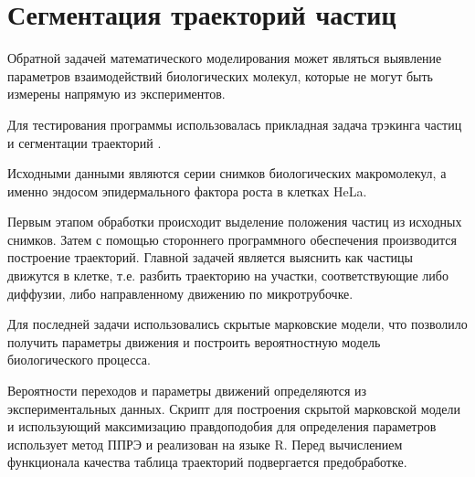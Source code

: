 \section*{Сегментация траекторий частиц}

Обратной задачей математического моделирования
может являться выявление параметров взаимодействий биологических молекул,
которые не могут быть измерены напрямую из экспериментов.

Для тестирования программы использовалась
прикладная задача трэкинга частиц
и сегментации траекторий \cite{track}.

Исходными данными являются
серии снимков биологических макромолекул,
а именно эндосом эпидермального фактора роста
в клетках HeLa.

Первым этапом обработки происходит выделение
положения частиц из исходных снимков.
Затем с помощью стороннего программного обеспечения
производится построение траекторий.
Главной задачей является выяснить
как частицы движутся в клетке,
т.е. разбить траекторию на участки,
соответствующие либо диффузии,
либо направленному движению по микротрубочке.

Для последней задачи использовались
скрытые марковские модели,
что позволило получить
параметры движения и
построить вероятностную модель
биологического процесса.

Вероятности переходов и параметры движений
определяются из экспериментальных данных.
Скрипт для построения скрытой марковской модели
и использующий максимизацию правдоподобия
для определения параметров использует
метод ППРЭ и реализован на языке R.
Перед вычислением функционала качества
таблица траекторий подвергается предобработке.

